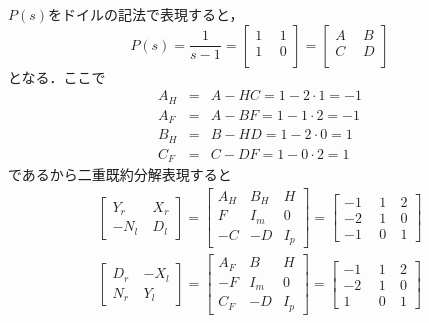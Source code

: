 \documentclass[a4paper,12pt]{jarticle}
\begin{document}
\vspace{-10mm}
\section*{}
$P(s)$をドイルの記法で表現すると，
%
\begin{equation}
 P(s)=\frac{1}{s-1}=
\left[
  \begin{array}{c|c}
   1 ~&~ 1  \\ \hline
   1 ~&~ 0   \\ 
  \end{array}
  \right]
=
\left[
  \begin{array}{c|c}
   A ~&~ B  \\ \hline
   C ~&~ D   \\ 
  \end{array}
  \right]
\end{equation}
%
となる．ここで
%
\begin{eqnarray}
 A_H&=&A-HC=1-2\cdot1=-1\\
 A_F&=&A-BF=1-1\cdot2=-1\\
 B_H&=&B-HD=1-2\cdot0=1\\
 C_F&=&C-DF=1-0\cdot2=1
\end{eqnarray}
%
であるから二重既約分解表現すると
%
\begin{eqnarray}
\left[
  \begin{array}{c|c}
   Y_r ~&~ X_r  \\ \hline
   -N_l &~ D_l   
  \end{array}
\right]
=
\left[
  \begin{array}{c|cc}
  A_H & B_H  & H  \\ \hline
  F   &  I_m & 0  \\
  -C  & -D   & I_p
  \end{array}
\right]
=
\left[
  \begin{array}{c|cc}
  -1  ~&~ 1 ~& 2  \\ \hline
  -2  ~&~ 1 ~& 0  \\
  -1  ~&~ 0 ~& 1
  \end{array}
  \right]
\\
\left[
  \begin{array}{c|c}
   D_r ~& -X_l  \\ \hline
   N_r ~& Y_l   
  \end{array}
\right]
=
\left[
  \begin{array}{c|cc}
  A_F & B    & H  \\ \hline
  -F  &  I_m & 0  \\
  C_F & -D   & I_p
  \end{array}
\right]
=
\left[
  \begin{array}{c|cc}
  -1  ~&~ 1 ~& 2  \\ \hline
  -2  ~&~ 1 ~& 0  \\
   1  ~&~ 0 ~& 1
  \end{array}
  \right]
\end{eqnarray}
\end{document}
